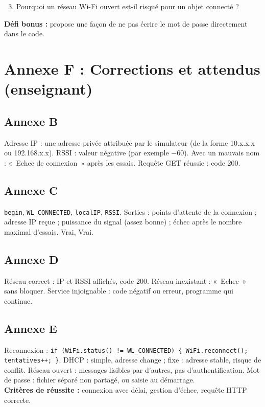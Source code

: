 \documentclass[11pt,a4paper]{article}
\begin{document}
\begin{enumerate}
\setcounter{enumi}{2}
 \item Pourquoi un réseau Wi-Fi ouvert est-il risqué pour un objet connecté ? \lig \lig
\end{enumerate}

\textbf{Défi bonus :} propose une façon de ne pas écrire le mot de passe directement dans le code.

\newpage
\section*{Annexe F : Corrections et attendus (enseignant)}

\subsection*{Annexe B}
Adresse IP : une adresse privée attribuée par le simulateur (de la forme 10.x.x.x ou 192.168.x.x). RSSI : valeur négative (par exemple $-60$). Avec un mauvais nom : «~Echec de connexion~» après les essais. Requête GET réussie : code 200.

\subsection*{Annexe C}
\texttt{begin}, \texttt{WL\_CONNECTED}, \texttt{localIP}, \texttt{RSSI}. Sorties : points d'attente de la connexion ; adresse IP reçue ; puissance du signal (assez bonne) ; échec après le nombre maximal d'essais. Vrai, Vrai.

\subsection*{Annexe D}
Réseau correct : IP et RSSI affichés, code 200. Réseau inexistant : «~Echec~» sans bloquer. Service injoignable : code négatif ou erreur, programme qui continue.

\subsection*{Annexe E}
Reconnexion : \texttt{if (WiFi.status() != WL\_CONNECTED) \{ WiFi.reconnect(); tentatives++; \}}. DHCP : simple, adresse change ; fixe : adresse stable, risque de conflit. Réseau ouvert : messages lisibles par d'autres, pas d'authentification. Mot de passe : fichier séparé non partagé, ou saisie au démarrage.\\
\textbf{Critères de réussite :} connexion avec délai, gestion d'échec, requête HTTP correcte.
\end{document}
